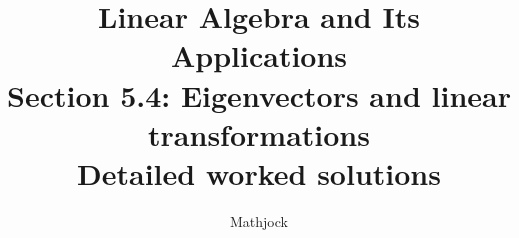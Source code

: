 
\title{\textbf{Linear Algebra and Its Applications}\\[0.3em]Section 5.4: Eigenvectors and linear transformations\\[0.3em]\large Detailed worked solutions}
\author{Mathjock}
\date{}

\maketitle
\bookinfo
\tableofcontents
\clearpage
\renewcommand{\thesection}{5.\arabic{section}}
\renewcommand{\theHsection}{5.\arabic{section}}
\setcounter{section}{3}


